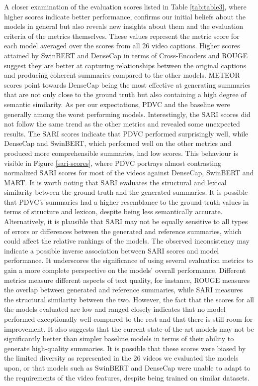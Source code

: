 A closer examination of the evaluation scores listed in Table \ref{tab:table3}, where higher scores indicate better performance, confirms our initial beliefs about the models in general but also reveals new insights about them and the evaluation criteria of the metrics themselves. These values represent the metric score for each model averaged over the scores from all 26 video captions. Higher scores attained by SwinBERT and DenseCap in terms of Cross-Encoders and ROUGE suggest they are better at capturing relationships between the original captions and producing coherent summaries compared to the other models. METEOR scores point towards DenseCap being the most effective at generating summaries that are not only close to the ground truth but also containing a high degree of semantic similarity. As per our expectations, PDVC and the baseline were generally among the worst performing models. Interestingly, the SARI scores did not follow the same trend as the other metrics and revealed some unexpected results. The SARI scores indicate that PDVC performed surprisingly well, while DenseCap and SwinBERT, which performed well on the other metrics and produced more comprehensible summaries, had low scores. This behaviour is visible in Figure \ref{sari-scores}, where PDVC portrays almost contrasting normalized SARI scores for most of the videos against DenseCap, SwinBERT and MART. It is worth noting that SARI evaluates the structural and lexical similarity between the ground-truth and the generated summaries. It is possible that PDVC's summaries had a higher resemblance to the ground-truth values in terms of structure and lexicon, despite being less semantically accurate. Alternatively, it is plausible that SARI may not be equally sensitive to all types of errors or differences between the generated and reference summaries, which could affect the relative rankings of the models. The observed inconsistency may indicate a possible inverse association between SARI scores and model performance. It underscores the significance of using several evaluation metrics to gain a more complete perspective on the models' overall performance. Different metrics measure different aspects of text quality, for instance, ROUGE measures the overlap between generated and reference summaries, while SARI measures the structural similarity between the two. However, the fact that the scores for all the models evaluated are low and ranged closely indicates that no model performed exceptionally well compared to the rest and that there is still room for improvement. It also suggests that the current state-of-the-art models may not be significantly better than simpler baseline models in terms of their ability to generate high-quality summaries. It is possible that these scores were biased by the limited diversity as represented in the 26 videos we evaluated the models upon, or that models such as SwinBERT and DenseCap were unable to adapt to the requirements of the video features, despite being trained on similar datasets.

